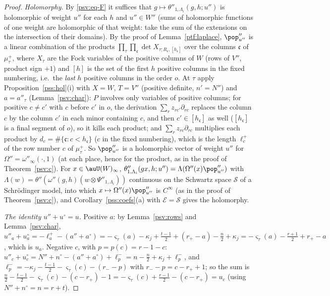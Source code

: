 \documentclass[10pt]{amsart}
\theoremstyle{definition}
\theoremstyle{remark}
\begin{document}
\begin{proof}
\emph{Holomorphy.} By \eqref{psv:eq-F} it suffices that $g\mapsto\theta''_{1,\Lambda_i}(g,h;u'')$ is holomorphic of weight
$u''$ for each $h$ and $u''\in W''$ (sums of holomorphic functions of one weight are holomorphic of that weight:
take the sum of the extensions on the intersection of their domains). By the proof of Lemma~\ref{ptf:laplace},
$\pop''_{u''}$ is a linear combination of the products $\prod_\tau\prod_{\mathfrak c}\det X_{\tau;R_{\mathfrak c},[h_{\mathfrak c}]}$ over
the columns $\mathfrak c$ of $\mu^+_\tau$, where $X_\tau$ are the Fock variables of the positive columns of $W$ (rows of
$V''$, product sign $+1$) and $[h]$ is the set of the first $h$ positive columns in the fixed numbering, i.e.\ the
\emph{last} $h$ positive columns in the order $o$. At $\tau$ apply Proposition~\ref{pss:hol}(i) with $X=W$, $T=V''$
(positive definite, $n'=N''$) and $a=a''_\tau$ (Lemma~\ref{psv:char}): $P$ involves only variables of positive columns;
for positive $c\ne c'$ with $c$ before $c'$ in $o$, the derivation $\sum_rz_{rc'}\partial_{rc}$ replaces the column $c$ by
the column $c'$ in each minor containing $c$, and then $c'\in[h_{\mathfrak c}]$ as well ($[h_{\mathfrak c}]$ is a final segment of
$o$), so it kills each product; and $\sum_rz_{rc}\partial_{rc}$ multiplies each product by $d_c=\#\{\mathfrak c:c<h_{\mathfrak c}\}$
($c$ in the fixed numbering), which is the length $\ell^+_c$ of the row number $c$ of $\mu^+_\tau$. So $\pop''_{u''}$ is a
holomorphic vector of weight $u''$ for $\Omega''=\omega''_\infty(\cdot,1)$ (at each place, hence for the product, as
in the proof of Theorem~\ref{psv:c}). For $x\in\auU(W)_\infty$, $\theta''_{1,\Lambda_i}(gx,h;u'')=\Lambda(\Omega''(x)\pop''_{u''})$
with $\Lambda(w)=\theta''(\omega''(g,h)(w\otimes\Psi''_{1,\Lambda_i}))$ continuous on the Schwartz space $\mathcal S$ of a Schr\"odinger model, into which $x\mapsto\Omega''(x)\pop''_{u''}$ is $C^\infty$ (as in the proof of
Theorem~\ref{psv:c}), and Corollary~\ref{pss:coefs}(a) with $\mathcal E=\mathcal S$ gives the holomorphy.

\emph{The identity $u''+u^\circ=u$.} Positive $a$: by Lemma~\ref{psv:rows} and Lemma~\ref{psv:char},
$u''_a+u^\circ_a=-\ell^+_a-(a''+a^\circ)=-\varsigma_\tau(a)-\kappa_j+\frac{t-1}2+(r_+-a)-\frac n2+\kappa_j=-\varsigma_\tau(a)-\frac{r+1}2+r_+-a$,
which is $u_a$. Negative $c$, with $p=p(c)=r-1-c$: $u''_c+u^\circ_c=N''+n^\circ-(a''+a^\circ)+\ell^-_p=n-\frac n2+\kappa_j+\ell^-_p$,
and $\ell^-_p=-\kappa_j-\frac{t-1}2-\varsigma_\tau(c)-(r_--p)$ with $r_--p=c-r_++1$; so the sum is
$\frac n2-\frac{t-1}2-\varsigma_\tau(c)-(c-r_+)-1=-\varsigma_\tau(c)+\frac{r-1}2-(c-r_+)=u_c$ (using $N''+n^\circ=n=r+t$).
\end{proof}
\end{document}

